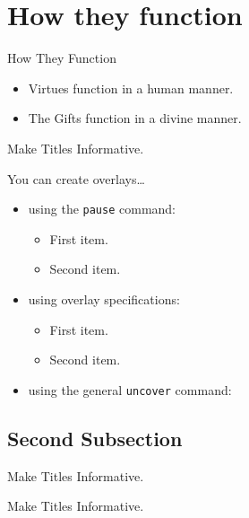 \documentclass{beamer}
\begin{document}
\section{How they function}

\begin{frame}{How They Function}
\begin{itemize}
\item Virtues function in a human manner.
\item The Gifts function in a divine manner.
\end{itemize}
\end{frame}

\begin{frame}{Make Titles Informative.}

  You can create overlays\dots
  \begin{itemize}
  \item using the \texttt{pause} command:
    \begin{itemize}
    \item
      First item.
      \pause
    \item    
      Second item.
    \end{itemize}
  \item
    using overlay specifications:
    \begin{itemize}
    \item<3->
      First item.
    \item<4->
      Second item.
    \end{itemize}
  \item
    using the general \texttt{uncover} command:
    \begin{itemize}
    \end{itemize}
  \end{itemize}
\end{frame}


\subsection{Second Subsection}

\begin{frame}{Make Titles Informative.}
\end{frame}

\begin{frame}{Make Titles Informative.}
\end{frame}
\end{document}
